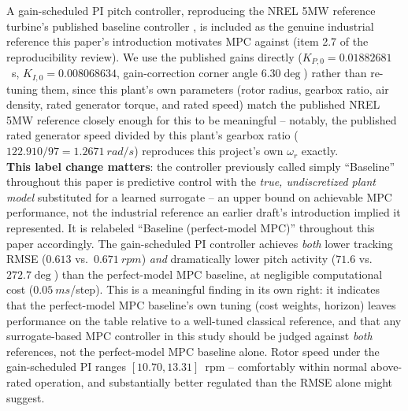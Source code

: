 \hspace{1.5cm} A gain-scheduled PI pitch controller, reproducing the NREL 5MW
reference turbine's published baseline controller
\cite{jonkman2009}, is included as the genuine industrial reference
this paper's introduction motivates MPC against (item 2.7 of the
reproducibility review). We use the published gains directly
($K_{P,0}=0.01882681$~s, $K_{I,0}=0.008068634$, gain-correction corner
angle $6.30\deg$) rather than re-tuning them, since this plant's own
parameters (rotor radius, gearbox ratio, air density, rated generator
torque, and rated speed) match the published NREL 5MW reference
closely enough for this to be meaningful -- notably, the published
rated generator speed divided by this plant's gearbox ratio
($122.910/97=\SI{1.2671}{rad/s}$) reproduces this project's own
$\omega_r$ exactly.\\ \textbf{This label change matters}: the
controller previously called simply ``Baseline'' throughout this
paper is predictive control with the \emph{true, undiscretized plant
model} substituted for a learned surrogate -- an upper bound on
achievable MPC performance, not the industrial reference an earlier
draft's introduction implied it represented. It is relabeled
``Baseline (perfect-model MPC)'' throughout this paper accordingly.
The gain-scheduled PI controller achieves \emph{both} lower tracking
RMSE ($0.613$ vs.\ $\SI{0.671}{rpm}$) \emph{and} dramatically lower
pitch activity ($71.6$ vs.\ $272.7\deg$) than the perfect-model MPC
baseline, at negligible computational cost
($\SI{0.05}{ms}$/step). This is a meaningful finding in its own
right: it indicates that the perfect-model MPC baseline's own tuning
(cost weights, horizon) leaves performance on the table relative to a
well-tuned classical reference, and that any surrogate-based MPC
controller in this study should be judged against \emph{both}
references, not the perfect-model MPC baseline alone. Rotor speed
under the gain-scheduled PI ranges $[10.70, 13.31]$~rpm -- comfortably
within normal above-rated operation, and substantially better
regulated than the RMSE alone might suggest.

